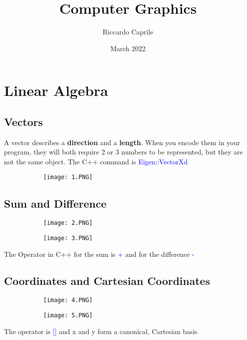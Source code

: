 \documentclass{article}
\title{Computer Graphics}
\author{Riccardo Caprile}
\date{March 2022}
\begin{document}
\maketitle

\section{Linear Algebra}
\subsection{Vectors}
A vector describes a \textbf{direction} and a \textbf{length}. When you encode them in your program, they will both require 2 or 3 numbers to be represented, but they are not the same object. The C++ command is \textcolor{blue}{Eigen::VectorXd}
\begin{figure}[ht!]
  \centering
  \begin{subfigure}[b]{0.6\linewidth}
    \texttt{[image: 1.PNG]}
  \end{subfigure}
\end{figure}
\subsection{Sum and Difference}
\begin{figure}[ht!]
  \centering
  \begin{subfigure}[b]{0.25\linewidth}
    \texttt{[image: 2.PNG]}
  \end{subfigure}
     \begin{subfigure}[b]{0.49\textwidth}
         \centering
         \texttt{[image: 3.PNG]}
     \end{subfigure}
\end{figure}
The Operator in C++ for the sum is \textcolor{blue}{+} and for the difference \textcolor{blue}{-}

\vspace{50mm}

\subsection{Coordinates and Cartesian Coordinates}
\begin{figure}[ht!]
  \centering
  \begin{subfigure}[b]{0.5\linewidth}
    \texttt{[image: 4.PNG]}
  \end{subfigure}
  \begin{subfigure}[b]{0.2\textwidth}
         \centering
         \texttt{[image: 5.PNG]}
     \end{subfigure}
\end{figure}
The operator is \textcolor{blue}{[]} and x and y form a canonical, Cartesian basis
\end{document}
